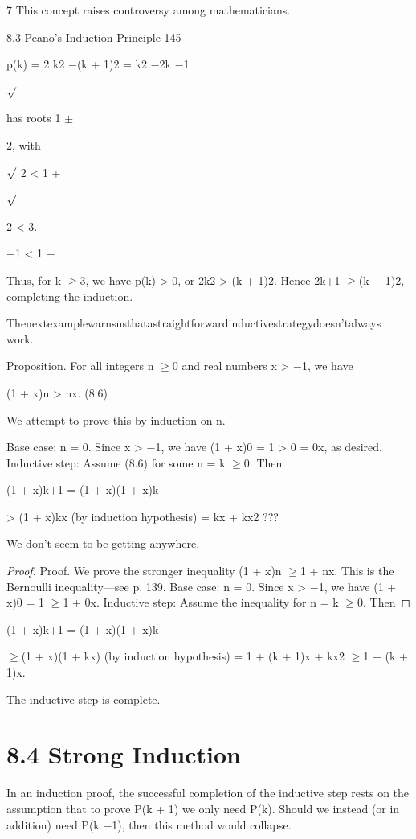 \documentclass[11pt]{article}
\theoremstyle{plain}
\theoremstyle{definition}
\begin{document}
7 This concept raises controversy among mathematicians.

8.3 Peano's Induction Principle 145

p(k) = 2 \textperiodcentered{} k2 $-$(k + 1)2 = k2 $-$2k $-$1

$\surd$

has roots 1 $\pm$

2, with

$\surd$ 2 < 1 +

$\surd$

2 < 3.

$-$1 < 1 $-$

Thus, for k $\geq$3, we have p(k) > 0, or 2k2 > (k + 1)2. Hence 2k+1 $\geq$(k + 1)2, completing the induction. 

Thenextexamplewarnsusthatastraightforwardinductivestrategydoesn'talways work.

Proposition. For all integers n $\geq$0 and real numbers x > $-$1, we have

(1 + x)n > nx. (8.6)

We attempt to prove this by induction on n.

Base case: n = 0. Since x > $-$1, we have (1 + x)0 = 1 > 0 = 0x, as desired. Inductive step: Assume (8.6) for some n = k $\geq$0. Then

(1 + x)k+1 = (1 + x)(1 + x)k

> (1 + x)kx (by induction hypothesis) = kx + kx2 ???

We don't seem to be getting anywhere.

\begin{proof}
Proof. We prove the stronger inequality (1 + x)n $\geq$1 + nx. This is the Bernoulli inequality---see p. 139. Base case: n = 0. Since x > $-$1, we have (1 + x)0 = 1 $\geq$1 + 0x. Inductive step: Assume the inequality for n = k $\geq$0. Then
\end{proof}

(1 + x)k+1 = (1 + x)(1 + x)k

$\geq$(1 + x)(1 + kx) (by induction hypothesis) = 1 + (k + 1)x + kx2 $\geq$1 + (k + 1)x.

The inductive step is complete. 

\section{8.4 Strong Induction}

In an induction proof, the successful completion of the inductive step rests on the assumption that to prove P(k + 1) we only need P(k). Should we instead (or in addition) need P(k $-$1), then this method would collapse.
\end{document}
